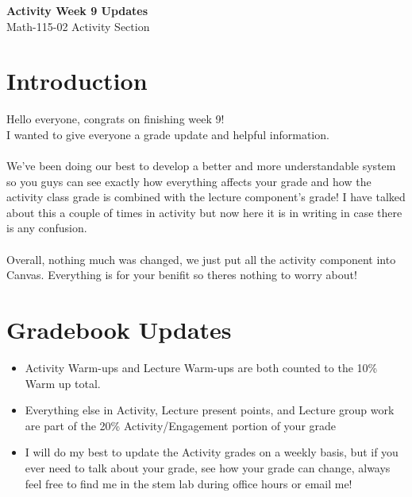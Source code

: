 \documentclass{article}
\begin{document}
\begin{center}
    \Large \textbf{Activity Week 9 Updates} \\
    \vspace{0.2cm}
    \normalsize Math-115-02 Activity Section\\
\end{center}
\section*{Introduction}
Hello everyone, congrats on finishing week 9! \\
I wanted to give everyone a grade update and helpful information.\\
\\
We’ve been doing our best to develop a better and more understandable 
system so you guys can see exactly how everything affects your grade 
and how the activity class grade is combined with the lecture 
component’s grade! I have talked about this a couple of times in 
activity but now here it is in writing in case there is any confusion. 
\\\\
Overall, nothing much was changed, 
we just put all the activity component into Canvas.
Everything is for your benifit so theres nothing to worry about!
\section*{Gradebook Updates}

\begin{itemize}
    \item Activity Warm-ups and Lecture Warm-ups are both 
          counted to the 10\% Warm up total. 
    \item Everything else in Activity, Lecture present points, and 
    Lecture group work are part of the 20\% 
    Activity/Engagement portion of your grade
    \item I will do my best to update the Activity grades on a weekly basis, 
but if you ever need to talk about your grade, see how your grade 
can change, always feel free to find me in the stem lab during 
office hours or email me!
\end{itemize}
\vspace{20cm}
\end{document}
